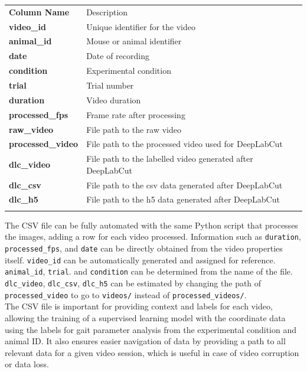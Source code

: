 \documentclass[11pt]{article}
\let\almaToprule\toprule
\let\almaMidrule\midrule
\let\almaBottomrule\bottomrule
\renewcommand{\toprule}{\arrayrulecolor{almaBlue!58}\almaToprule\rowcolor{almaSky!78}}
\renewcommand{\midrule}{\arrayrulecolor{almaBlue!48}\almaMidrule}
\renewcommand{\bottomrule}{\arrayrulecolor{almaBlue!58}\almaBottomrule}
\renewcommand{\[}{%
  \par\smallskip\noindent
  \begin{center}%
  \setlength{\fboxsep}{5pt}%
  \setlength{\fboxrule}{0.35pt}%
  \begin{lrbox}{\almaEquationBox}%
  $\displaystyle
}
\renewcommand{\]}{%
  $%
  \end{lrbox}%
  \fcolorbox{equationLine}{equationBack}{\usebox{\almaEquationBox}}%
  \end{center}%
  \smallskip\par
}
\begin{document}
\begin{tcolorbox}[blue table box,title=\textbf{Metadata Columns}]
\begin{tabularx}{\linewidth}{>{\bfseries}p{4cm}X}
\toprule
Column Name & Description \\
\midrule
video\_id & Unique identifier for the video \\
animal\_id & Mouse or animal identifier \\
date & Date of recording \\
condition & Experimental condition \\
trial & Trial number \\
duration & Video duration \\
processed\_fps & Frame rate after processing \\
raw\_video & File path to the raw video \\
processed\_video & File path to the processed video used for DeepLabCut \\
dlc\_video& File path to the labelled video generated after DeepLabCut \\
dlc\_csv & File path to the csv data generated after DeepLabCut \\
dlc\_h5& File path to the h5 data generated after DeepLabCut \\
\bottomrule
\end{tabularx}
\end{tcolorbox}

\noindent The CSV file can be fully automated with the same Python script that processes the images, adding a row for each video processed. Information such as \texttt{duration}, \texttt{processed\_fps}, and \texttt{date} can be directly obtained from the video properties itself. \texttt{video\_id} can be automatically generated and assigned for reference. \texttt{animal\_id}, \texttt{trial}. and \texttt{condition} can be determined from the name of the file. \texttt{dlc\_video}, \texttt{dlc\_csv}, \texttt{dlc\_h5} can be estimated by changing the path of \texttt{processed\_video} to go to \texttt{videos/} instead of \texttt{processed\_videos/}. \\

The CSV file is important for providing context and labels for each video, allowing the training of a supervised learning model with the coordinate data using the labels for gait parameter analysis from the experimental condition and animal ID. It also ensures easier navigation of data by providing a path to all relevant data for a given video session, which is useful in case of video corruption or data loss. 
\end{document}
